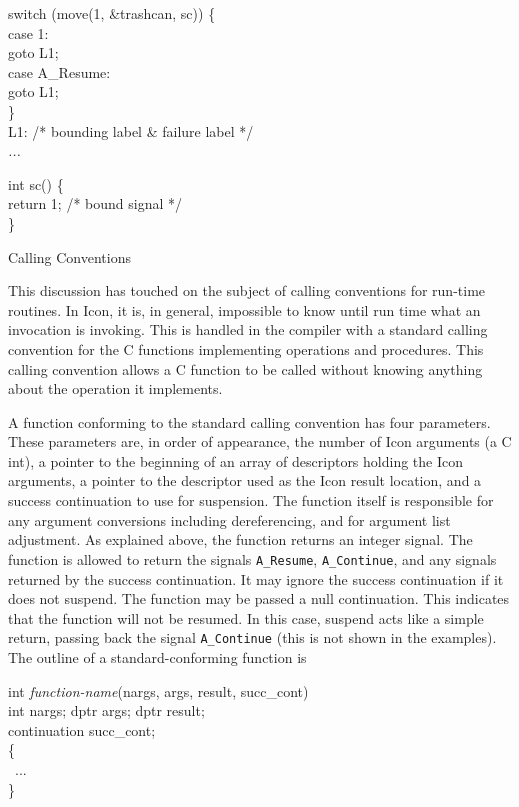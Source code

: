 \goodbreak
\begin{iconcode}
\>switch (move(1, \&trashcan, sc)) \{\\
\>\>case 1:\\
\>\>\>goto L1;\\
\>\>case A\_Resume:\\
\>\>\>goto L1;\\
\>\}\\
L1: /* bounding label \& failure label */\\
\>\textit{...}\\
\end{iconcode}
\goodbreak
\begin{iconcode}
int sc() \{\\
\>return 1; /* bound signal */\\
\}\\
\end{iconcode}

\noindent
{\sffamily
Calling Conventions}


This discussion has touched on the subject of calling conventions for
run-time routines. In Icon, it is, in general, impossible to know
until run time what an invocation is invoking. This is handled in the
compiler with a standard calling convention for the C functions
implementing operations and procedures. This calling convention allows
a C function to be called without knowing anything about the operation
it implements.

A function conforming to the standard calling convention has four
parameters. These parameters are, in order of appearance, the number
of Icon arguments (a C int), a pointer to the beginning of an array of
descriptors holding the Icon arguments, a pointer to the descriptor
used as the Icon result location, and a success continuation to use
for suspension. The function itself is responsible for any argument
conversions including dereferencing, and for argument list
adjustment. As explained above, the function returns an integer
signal. The function is allowed to return the signals
\texttt{A\_Resume}, \texttt{A\_Continue}, and any signals returned by
the success continuation. It may ignore the success continuation if it
does not suspend. The function may be passed a null continuation. This
indicates that the function will not be resumed. In this case, suspend
acts like a simple return, passing back the signal \texttt{A\_Continue}
(this is not shown in the examples). The outline of a
standard-conforming function is

\goodbreak
\begin{iconcode}
int \textit{function-name}(nargs, args, result, succ\_cont)\\
int nargs; dptr args; dptr result;\\
continuation succ\_cont;\\
\{\\
\>\ ...\\
\}\\
\end{iconcode}

